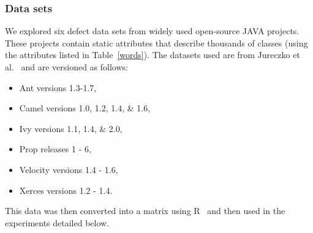\documentclass[]{svjour3}
\begin{document}
\subsubsection{Data sets}
We explored six defect data sets from widely used open-source JAVA projects.
These projects contain static attributes that describe thousands of classes (using the attributes listed in   Table~\ref{words}). The datasets used are from Jureczko et al.~\cite{defectDatasets} and are versioned as follows:
\begin{itemize}
    \item  Ant versions 1.3-1.7, 
    \item Camel versions 1.0, 1.2, 1.4, \& 1.6, 
    \item Ivy versions 1.1, 1.4, \& 2.0, 
    \item Prop releases 1 - 6, 
    \item Velocity versions 1.4 - 1.6, 
    \item Xerces versions 1.2 - 1.4. 
\end{itemize}
 This data was then converted into a matrix using R~\cite{RSoftware} and then used in  the experiments detailed below.
 
\end{document}
